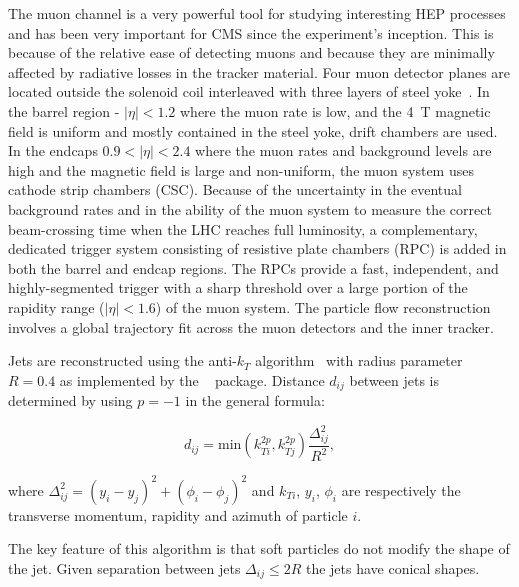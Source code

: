 The muon channel is a very powerful tool for studying interesting HEP processes and has been very important for CMS since the experiment's inception. This is because of the relative ease of detecting muons and because they are minimally affected by radiative losses in the tracker material. Four muon detector planes are located outside the solenoid coil interleaved with three layers of steel yoke~\cite{muon_tech_rep}. In the barrel region - $\left|\eta\right|<1.2$ where the muon rate is low, and the 4~T magnetic field is uniform and mostly contained in the steel yoke, drift chambers are used. In the endcaps $0.9<\left|\eta\right|<2.4$ where the muon rates and background levels are high and the magnetic field is large and non-uniform, the muon system uses cathode strip chambers (CSC). Because of the uncertainty in the eventual background rates and in the ability of the muon system to measure the correct beam-crossing time when the LHC reaches full luminosity, a complementary, dedicated trigger system consisting of resistive plate chambers (RPC) is added in both the barrel and endcap regions. The RPCs provide a fast, independent, and highly-segmented trigger with a sharp \pt threshold over a large portion of the rapidity range ($\left|\eta\right|<1.6$) of the muon system. The particle flow reconstruction involves a global trajectory fit across the muon detectors and the inner tracker. 

Jets are reconstructed using the anti-$k_{T}$ algorithm~\cite{Cacciari:2008gp} with radius parameter $R=0.4$ as implemented by the \FASTJET~\cite{Cacciari:2011ma} package. Distance $d_{ij}$ between jets is determined by using $p=-1$ in the general formula:

\begin{equation}
d_{ij}=\text{min}(k_{Ti}^{2p}, k_{Tj}^{2p})\frac{\Delta_{ij}^{2}}{R^{2}},
\end{equation}

\noindent where $\Delta_{ij}^{2}=(y_{i}-y_{j})^{2}+(\phi_{i}-\phi_{j})^{2}$ and $k_{Ti}$, $y_{i}$, $\phi_{i}$ are respectively the transverse momentum, rapidity and azimuth of particle $i$. 

The key feature of this algorithm is that soft particles do not modify the shape of the jet. Given separation between jets $\Delta_{ij}\leq2R$ the jets have conical shapes. 
